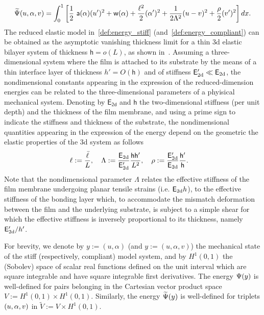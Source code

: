 \begin{equation}
    \label{def:energy_compliant}
    \widetilde\Psi( u, \alpha,  v) = \int_{0}^1 \left[ \frac{1}{2} \ \mathsf{a}(\alpha)(u')^2 + \mathsf{w}(\alpha) + \frac{\ell^2}{2}(\alpha')^2
        + \frac{1}{2 \Lambda^2} (u- v)^2
        + \frac{\rho}{2}  (v')^2 \right] dx.
\end{equation} {The reduced elastic model in~\eqref{def:energy_stiff} (and~\eqref{def:energy_compliant}) can be obtained as the asymptotic vanishing thickness limit for a thin 3d elastic bilayer system of thickness  $\mathsf h = o(L)$, as shown in~\cite{Leon_Baldelli2015-rp}. Assuming a three-dimensional system where the film is attached to its substrate by the means of a thin interface layer of thickness $h'=O(\mathsf h)$ and of stiffness ${\mathsf{E_{\text{2d}}'}} \ll \mathsf{E_{\text{2d}}}$, the nondimensional constants appearing in the expression of the reduced-dimension energies can be related to the three-dimensional parameters of a phyisical mechanical system.}
Denoting by $\mathsf{E_\text{2d}}$ and $\mathsf h$ the two-dimensional stiffness (per unit depth) and the thickness of the film membrane, and using a prime sign to indicate the stiffness and thickness of the substrate, the nondimensional quantities appearing in the expression of the energy depend on the geometric the elastic properties of the 3d system as follows
\begin{equation}
    \label{def:dimensional_parameters}
    \ell := \frac{\bar{\ell}}{L}, \quad
    \Lambda := \frac{\mathsf{E_{\text{2d}}}}{{\mathsf{E_{\text{2d}}'}}} {\frac{\mathsf h \mathsf h'}{L^2}}, \quad
    \rho := \frac{{\mathsf{E_{\text{2d}}'}}}{\mathsf{E_{\text{2d}}}} {\frac{\mathsf{h'}}{\mathsf h}}. \quad
\end{equation}
Note that the nondimensional parameter $\Lambda$ relates the effective stiffness of the film membrane undergoing planar tensile strains (i.e. $\mathsf{E_{\text{2d}}} h$), to the effective stiffness of the bonding layer which, to accommodate the mismatch deformation between the film and the underlying substrate, is subject to a simple shear for which the effective stiffness is inversely proportional to its thickness, namely ${\mathsf{E_{\text{2d}}'}} / h'$.

For brevity, we denote by $y:=(u, \alpha)$ (and $y:=(u, \alpha, v)$) the mechanical state of the stiff (respectively, compliant) model system, and by $H^1(0, 1)$ the (Sobolev) space of scalar real functions defined on the unit interval which are square integrable and have square integrable first derivatives. The energy $\Psi(y)$ is well-defined for pairs belonging in the Cartesian vector product space $V:=H^1(0,1)\times  H^1(0,1)$. Similarly, the energy $\widetilde\Psi(y)$ is well-defined for triplets $(u, \alpha, v)$ in $\widetilde V:=V\times  H^1(0,1)$.



